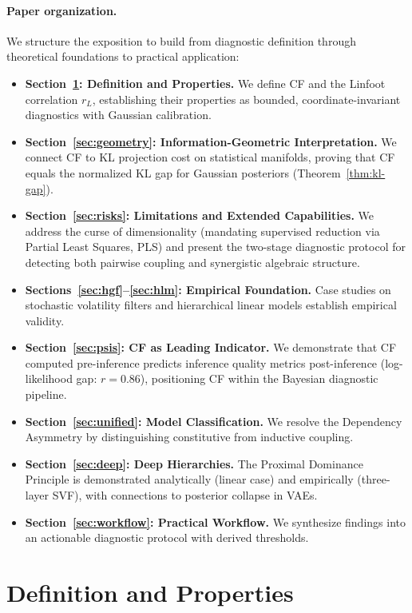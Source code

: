 \documentclass[10pt]{article} %
\theoremstyle{plain}
\theoremstyle{definition}
\begin{document}
\paragraph{Paper organization.} We structure the exposition to build from diagnostic definition through theoretical foundations to practical application:
\begin{itemize}
    \item \textbf{Section~\ref{sec:definition}: Definition and Properties.} We define CF and the Linfoot correlation $r_L$, establishing their properties as bounded, coordinate-invariant diagnostics with Gaussian calibration.
    \item \textbf{Section~\ref{sec:geometry}: Information-Geometric Interpretation.} We connect CF to KL projection cost on statistical manifolds, proving that CF equals the normalized KL gap for Gaussian posteriors (Theorem~\ref{thm:kl-gap}).
    \item \textbf{Section~\ref{sec:risks}: Limitations and Extended Capabilities.} We address the curse of dimensionality (mandating supervised reduction via Partial Least Squares, PLS) and present the two-stage diagnostic protocol for detecting both pairwise coupling and synergistic algebraic structure.
    \item \textbf{Sections~\ref{sec:hgf}--\ref{sec:hlm}: Empirical Foundation.} Case studies on stochastic volatility filters and hierarchical linear models establish empirical validity.
    \item \textbf{Section~\ref{sec:psis}: CF as Leading Indicator.} We demonstrate that CF computed pre-inference predicts inference quality metrics post-inference (log-likelihood gap: $r = 0.86$), positioning CF within the Bayesian diagnostic pipeline.
    \item \textbf{Section~\ref{sec:unified}: Model Classification.} We resolve the Dependency Asymmetry by distinguishing constitutive from inductive coupling.
    \item \textbf{Section~\ref{sec:deep}: Deep Hierarchies.} The Proximal Dominance Principle is demonstrated analytically (linear case) and empirically (three-layer SVF), with connections to posterior collapse in VAEs.
    \item \textbf{Section~\ref{sec:workflow}: Practical Workflow.} We synthesize findings into an actionable diagnostic protocol with derived thresholds.
\end{itemize}


\section{Definition and Properties}
\label{sec:definition}
\end{document}
